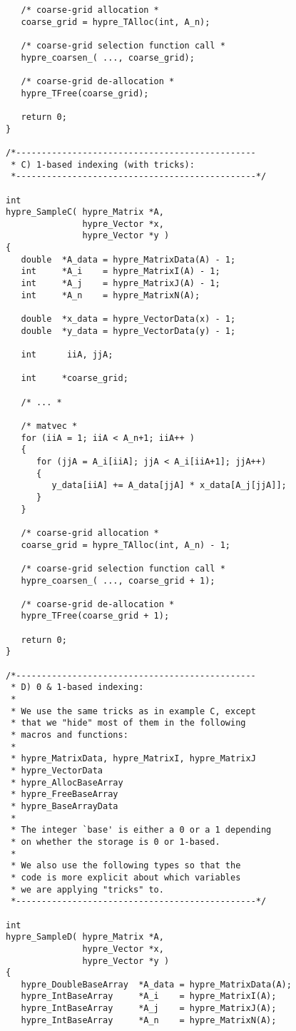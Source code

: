 \begin{verbatim}
   /* coarse-grid allocation *
   coarse_grid = hypre_TAlloc(int, A_n);

   /* coarse-grid selection function call *
   hypre_coarsen_( ..., coarse_grid);

   /* coarse-grid de-allocation *
   hypre_TFree(coarse_grid);

   return 0;
}

/*-----------------------------------------------
 * C) 1-based indexing (with tricks):
 *-----------------------------------------------*/

int
hypre_SampleC( hypre_Matrix *A,
               hypre_Vector *x,
               hypre_Vector *y )
{
   double  *A_data = hypre_MatrixData(A) - 1;
   int     *A_i    = hypre_MatrixI(A) - 1;
   int     *A_j    = hypre_MatrixJ(A) - 1;
   int     *A_n    = hypre_MatrixN(A);

   double  *x_data = hypre_VectorData(x) - 1;
   double  *y_data = hypre_VectorData(y) - 1;

   int      iiA, jjA;

   int     *coarse_grid;

   /* ... *

   /* matvec *
   for (iiA = 1; iiA < A_n+1; iiA++ )
   {
      for (jjA = A_i[iiA]; jjA < A_i[iiA+1]; jjA++)
      {
         y_data[iiA] += A_data[jjA] * x_data[A_j[jjA]];
      }
   }

   /* coarse-grid allocation *
   coarse_grid = hypre_TAlloc(int, A_n) - 1;

   /* coarse-grid selection function call *
   hypre_coarsen_( ..., coarse_grid + 1);

   /* coarse-grid de-allocation *
   hypre_TFree(coarse_grid + 1);

   return 0;
}

/*-----------------------------------------------
 * D) 0 & 1-based indexing:
 *
 * We use the same tricks as in example C, except
 * that we "hide" most of them in the following
 * macros and functions:
 *
 * hypre_MatrixData, hypre_MatrixI, hypre_MatrixJ
 * hypre_VectorData
 * hypre_AllocBaseArray
 * hypre_FreeBaseArray
 * hypre_BaseArrayData
 *
 * The integer `base' is either a 0 or a 1 depending
 * on whether the storage is 0 or 1-based.
 *
 * We also use the following types so that the
 * code is more explicit about which variables
 * we are applying "tricks" to.
 *-----------------------------------------------*/

int
hypre_SampleD( hypre_Matrix *A,
               hypre_Vector *x,
               hypre_Vector *y )
{
   hypre_DoubleBaseArray  *A_data = hypre_MatrixData(A);
   hypre_IntBaseArray     *A_i    = hypre_MatrixI(A);
   hypre_IntBaseArray     *A_j    = hypre_MatrixJ(A);
   hypre_IntBaseArray     *A_n    = hypre_MatrixN(A);


\end{verbatim}
